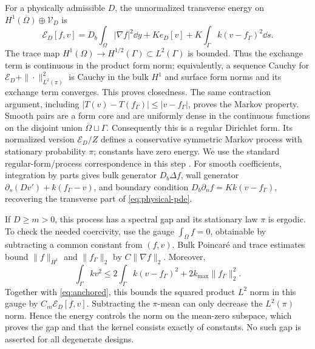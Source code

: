 For a physically admissible $D$, the unnormalized transverse energy on
$H^1(\Omega)\oplus\mathcal V_D$ is
\begin{equation}\label{eq:coupled-energy}
 \mathcal E_D[f,v]=D_b\int_\Omega|\nabla f|^2\dd y
       +K e_D[v]+K\int_\Gamma k(v-f_\Gamma)^2\dd s.
\end{equation}
The trace map $H^1(\Omega)\to H^{1/2}(\Gamma)\subset L^2(\Gamma)$
is bounded. Thus the exchange term is continuous in the product form
norm; equivalently, a sequence Cauchy for $\mathcal E_D+\|\cdot\|_{L^2(\pi)}^2$
is Cauchy in the bulk $H^1$ and surface form norms and its exchange term
converges. This proves closedness. The same contraction argument,
including $|T(v)-T(f_\Gamma)|\le|v-f_\Gamma|$, proves the Markov property.
Smooth pairs are a form core and are uniformly dense in the continuous
functions on the disjoint union $\overline\Omega\sqcup\Gamma$.
Consequently this is a regular Dirichlet form. Its normalized version
$\mathcal E_D/Z$ defines a conservative symmetric Markov process with
stationary probability $\pi$; constants have zero energy. We use the
standard regular-form/process correspondence in this step
\citep[Theorem~7.2.1]{FukushimaOshimaTakeda2011}. For smooth coefficients,
integration by parts gives bulk generator $D_b\Delta f$, wall generator
$\partial_s(Dv')+k(f_\Gamma-v)$, and boundary condition
$D_b\partial_n f=Kk(v-f_\Gamma)$, recovering the transverse part of
\eqref{eq:physical-pde}.

If $D\ge m>0$, this process has a spectral gap and its stationary
law $\pi$ is ergodic. To check the needed coercivity, use the gauge
$\int_\Omega f=0$, obtainable by subtracting a common constant from
$(f,v)$. Bulk Poincar\'e and trace estimates bound $\|f\|_{H^1}$ and
$\|f_\Gamma\|_2$ by $C\|\nabla f\|_2$. Moreover,
\[
 \int_\Gamma kv^2
 \le2\int_\Gamma k(v-f_\Gamma)^2+2k_{\max}\|f_\Gamma\|_2^2.
\]
Together with \eqref{eq:anchored}, this bounds the squared product $L^2$
norm in this gauge by $C_m\mathcal E_D[f,v]$. Subtracting the
$\pi$-mean can only decrease the $L^2(\pi)$ norm. Hence the energy
controls the norm on the mean-zero subspace, which proves the gap and
that the kernel consists exactly of constants. No such gap is asserted
for all degenerate designs.


